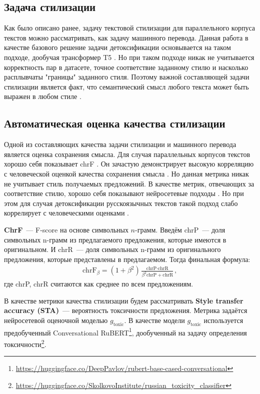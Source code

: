 \subsection{Задача стилизации}

Как было описано ранее, задачу текстовой стилизации для параллельного корпуса текстов можно рассматривать, как задачу машинного перевода. 
Данная работа в качестве базового решение задачи детоксификации основывается на таком подходе, дообучая трансформер T5 \cite{t5}.
Но при таком подходе никак не учитывается корректность пар в датасете, точное соответствие заданному стилю и насколько расплывчаты "границы" заданного стиля.
Поэтому важной составляющей задачи стилизации является факт, что семантический смысл любого текста может быть выражен в любом стиле \cite{Tikhonov2018WhatIW}.   

\subsection{Автоматическая оценка качества стилизации}
\label{section:autoeval}
Одной из составляющих качества задачи стилизации и машинного перевода является оценка сохранения смысла. 
Для случая параллельных корпусов текстов хорошо себя показывает chrF \cite{popovic-2015-chrf}.
Он зачастую демонстрирует высокую корреляцию с человеческой оценкой качества сохранения смысла \cite{briakou-etal-2021-evaluating, logacheva-etal-2022-study}. 
Но данная метрика никак не учитывает стиль получаемых предложений.
В качестве метрик, отвечающих за соответствие стилю, хорошо себя показывают нейросетевые подходы \cite{briakou-etal-2021-evaluating}. 
Но при этом для случая детоксификации русскоязычных текстов такой подход слабо коррелирует с человеческими оценками \cite{logacheva-etal-2022-study}.

\textbf{ChrF}~--- F-score на основе символьных $n$-грамм.
Введём chrP~--- доля символьных n-грамм из предлагаемого предложения, которые имеются в оригинальном.
И chrR~--- доля символьных n-грамм из оригинального предложения, которые представлены в предлагаемом. 
Тогда финальная формула:
\begin{gather*}
    \text{chrF}_{\beta} = (1 + \beta^2) \frac{\text{chrP} \cdot \text{chrR}}{\beta^2 \text{chrP} + \text{chrR}},
\end{gather*}
где chrP, chrR считаются как среднее по всем предложениям. 

В качестве метрики качества стилизации будем рассматривать \textbf{Style transfer accuracy (STA)}~--- вероятность токсичности предложения.
Метрика задаётся нейросетевой оценочной моделью $g_{\text{toxic}}$.
В качестве модели $g_{\text{toxic}}$ используется предобученный Conversational RuBERT\footnote{\url{https://huggingface.co/DeepPavlov/rubert-base-cased-conversational}}, дообученный на задачу определения токсичности\footnote{\url{https://huggingface.co/SkolkovoInstitute/russian_toxicity_classifier}}. 


